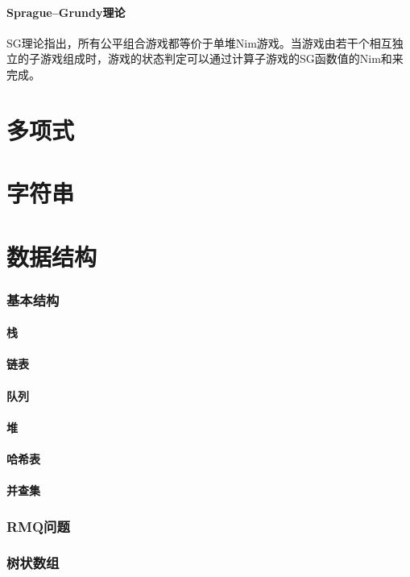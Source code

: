 \documentclass[12pt,a4paper]{article}
\begin{document}
\subsection{Sprague–Grundy理论}
SG理论指出，所有公平组合游戏都等价于单堆Nim游戏。当游戏由若干个相互独立的子游戏组成时，游戏的状态判定可以通过计算子游戏的SG函数值的Nim和来完成。

\newpage
\part{多项式}

\newpage
\part{字符串}

\newpage
\part{数据结构} %
\section{基本结构}
\subsection{栈} %
\subsection{链表} %
\subsection{队列}
\subsection{堆} %
\subsection{哈希表} %
\subsection{并查集}
\section{RMQ问题}
\section{树状数组}
\end{document}

